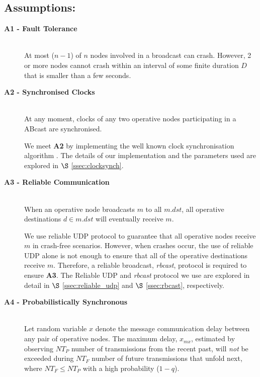     \subsection*{Assumptions:}  
    \begin{description} 
        \item [\textbf{A1 - Fault Tolerance}] \hfill \\
        At most ($n-1$) of $n$ nodes involved in a broadcast can crash. However, 2 or more nodes cannot crash within an interval of some finite duration $D$ that is smaller than a few seconds.
        
        \item [\textbf{A2 - Synchronised Clocks}] \hfill \\
        At any moment, clocks of any two operative nodes participating in a \textsf{ABcast} are synchronised.  
        
        We meet \textbf{A2} by implementing the well known clock synchronisation algorithm \citep{Cristian:1996:SA:227210.227231}.  The details of our implementation and the parameters used are explored in $\S$ \ref{ssec:clocksynch}.       
        
        \item [\textbf{A3 - Reliable Communication}] \hfill \\
        When an operative node broadcasts $m$ to all $m.dst$, all operative destinations $d \in m.dst$ will eventually receive $m$.  
        
        We use reliable UDP protocol to guarantee that all operative nodes receive $m$ in crash-free scenarios.  However, when crashes occur, the use of reliable UDP alone is not enough to ensure that all of the operative destinations receive $m$.  Therefore, a reliable broadcast, \emph{rbcast}, protocol is required to ensure \textbf{A3}.  The Reliable UDP and \emph{rbcast} protocol we use are explored in detail in $\S$ \ref{ssec:reliable_udp} and $\S$ \ref{ssec:rbcast}, respectively.  
        
        \item [\textbf{A4 - Probabilistically Synchronous}] \hfill \\
        Let random variable $x$ denote the message communication delay between any pair of operative nodes. The maximum delay, $x_{mx}$, estimated by observing $NT_P$ number of transmissions from the recent past, will \emph{not} be exceeded during $NT_F$ number of future transmissions that unfold next, where $NT_F \leq NT_P$ with a high probability ($1 - q$).
        

\end{description}
